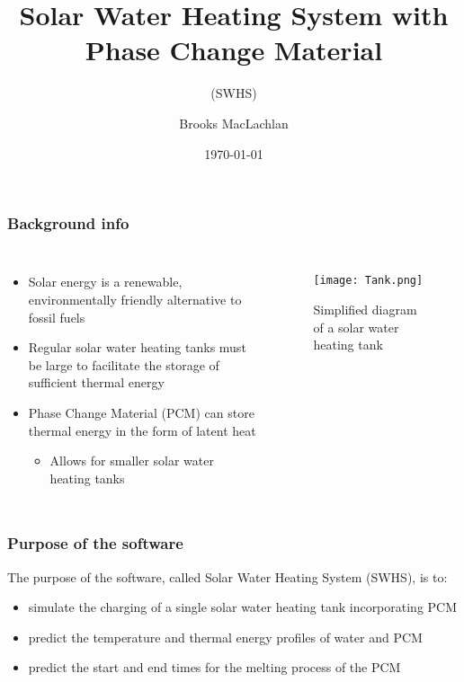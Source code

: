\documentclass{beamer}
\title{Solar Water Heating System with Phase Change Material}
\subtitle{(SWHS)}
\author{Brooks MacLachlan}
\date{\today}
\begin{document}
	
\begin{frame}
	\titlepage
\end{frame}
	
\begin{frame}
	\frametitle{Background info}
	\begin{columns}
	\begin{itemize}
	\item Solar energy is a renewable, environmentally friendly alternative to fossil fuels
	\item Regular solar water heating tanks must be large to facilitate the storage of sufficient thermal energy
	\item Phase Change Material (PCM) can store thermal energy in the form of latent heat
	\begin{itemize}
	\item Allows for smaller solar water heating tanks
	\end{itemize}
	\end{itemize}
	\begin{figure}[center]
	\texttt{[image: Tank.png]}
	\caption{Simplified diagram of a solar water heating tank}
	\end{figure}
	\end{columns}
\end{frame}
	
\begin{frame}
	\frametitle{Purpose of the software}
	The purpose of the software, called Solar Water Heating System (SWHS), is to:
	\begin{itemize}
	\item simulate the charging of a single solar water heating tank incorporating PCM
	\item predict the temperature and thermal energy profiles of water and PCM
	\item predict the start and end times for the melting process of the PCM
	\end{itemize}
\end{frame}
		
\end{document}
